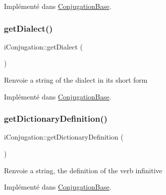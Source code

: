 Implémenté dans \hyperlink{class_conjugation_base_ae5b10d1201dfc7ed1c56b1f5a073bbdb}{Conjugation\+Base}.

\hypertarget{interfacei_conjugation_a4e0b6c0923ecd596b6acff6c7b776f5f}{}\label{interfacei_conjugation_a4e0b6c0923ecd596b6acff6c7b776f5f} 
\subsubsection{\texorpdfstring{get\+Dialect()}{getDialect()}}
{\footnotesize\ttfamily i\+Conjugation\+::get\+Dialect (\begin{DoxyParamCaption}{ }\end{DoxyParamCaption})}

\begin{DoxyReturn}{Renvoie}
a string of the dialect in its short form 
\end{DoxyReturn}


Implémenté dans \hyperlink{class_conjugation_base_a5010621a363fcfe26e5d23ade06d2c41}{Conjugation\+Base}.

\hypertarget{interfacei_conjugation_ab13cedc1b4f0d064a9bfff3cbfb63de6}{}\label{interfacei_conjugation_ab13cedc1b4f0d064a9bfff3cbfb63de6} 
\subsubsection{\texorpdfstring{get\+Dictionary\+Definition()}{getDictionaryDefinition()}}
{\footnotesize\ttfamily i\+Conjugation\+::get\+Dictionary\+Definition (\begin{DoxyParamCaption}{ }\end{DoxyParamCaption})}

\begin{DoxyReturn}{Renvoie}
a string, the definition of the verb infinitive 
\end{DoxyReturn}


Implémenté dans \hyperlink{class_conjugation_base_aae493e154b07045a3ea072760ac44ef4}{Conjugation\+Base}.

\hypertarget{interfacei_conjugation_a21390064de33a77b99b26ec5a2e55351}{}\label{interfacei_conjugation_a21390064de33a77b99b26ec5a2e55351} 
